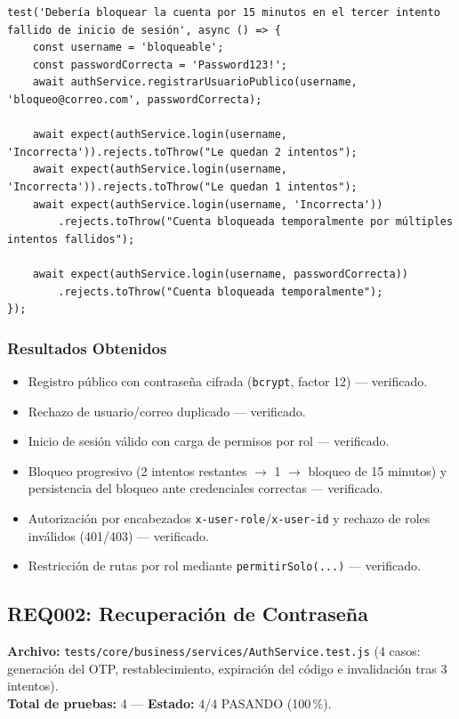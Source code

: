 \documentclass[12pt,a4paper]{article}
\begin{document}
\begin{lstlisting}[caption={Prueba de bloqueo por 3 intentos fallidos (\texttt{AuthService.test.js})}]
test('Debería bloquear la cuenta por 15 minutos en el tercer intento fallido de inicio de sesión', async () => {
    const username = 'bloqueable';
    const passwordCorrecta = 'Password123!';
    await authService.registrarUsuarioPublico(username, 'bloqueo@correo.com', passwordCorrecta);

    await expect(authService.login(username, 'Incorrecta')).rejects.toThrow("Le quedan 2 intentos");
    await expect(authService.login(username, 'Incorrecta')).rejects.toThrow("Le quedan 1 intentos");
    await expect(authService.login(username, 'Incorrecta'))
        .rejects.toThrow("Cuenta bloqueada temporalmente por múltiples intentos fallidos");

    await expect(authService.login(username, passwordCorrecta))
        .rejects.toThrow("Cuenta bloqueada temporalmente");
});
\end{lstlisting}

\subsubsection*{Resultados Obtenidos}
\begin{itemize}[nosep]
    \item Registro público con contraseña cifrada (\texttt{bcrypt}, factor 12) — verificado.
    \item Rechazo de usuario/correo duplicado — verificado.
    \item Inicio de sesión válido con carga de permisos por rol — verificado.
    \item Bloqueo progresivo (2 intentos restantes $\rightarrow$ 1 $\rightarrow$ bloqueo de
    15 minutos) y persistencia del bloqueo ante credenciales correctas — verificado.
    \item Autorización por encabezados \texttt{x-user-role}/\texttt{x-user-id} y rechazo de
    roles inválidos (401/403) — verificado.
    \item Restricción de rutas por rol mediante \texttt{permitirSolo(...)} — verificado.
\end{itemize}

\subsection{REQ002: Recuperación de Contraseña}
\textbf{Archivo:} \texttt{tests/core/business/services/AuthService.test.js} (4 casos:
generación del OTP, restablecimiento, expiración del código e invalidación tras 3 intentos).\\
\textbf{Total de pruebas:} 4 — \textbf{Estado:} 4/4 PASANDO (100\,\%).
\end{document}
